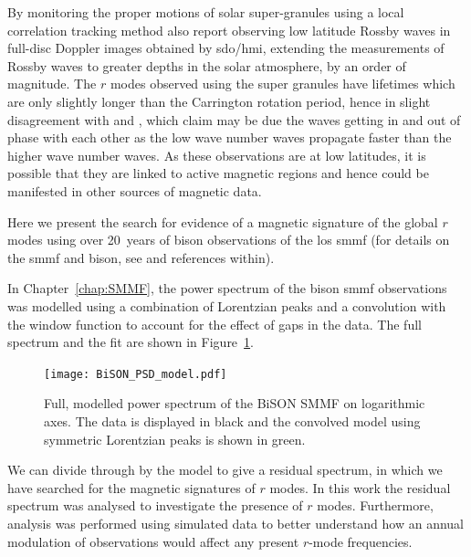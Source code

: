By monitoring the proper motions of solar super-granules using a local correlation tracking method \citet{hathaway_hydrodynamic_2020} also report observing low latitude Rossby waves in full-disc Doppler images obtained by \gls{sdo/hmi}, extending the measurements of Rossby waves to greater depths in the solar atmosphere, by an order of magnitude. The $r$ modes observed using the super granules have lifetimes which are only slightly longer than the Carrington rotation period, hence in slight disagreement with \citet{loptien_global-scale_2018} and \citet{liang_time-distance_2019}, which \citet{hathaway_hydrodynamic_2020} claim may be due the waves getting in and out of phase with each other as the low wave number waves propagate faster than the higher wave number waves. As these observations are at low latitudes, it is possible that they are linked to active magnetic regions and hence could be manifested in other sources of magnetic data.

Here we present the search for evidence of a magnetic signature of the global $r$ modes using over 20~years of \gls{bison} observations of the \gls{los} \gls{smmf} (for details on the \gls{smmf} and \gls{bison}, see \citet{chaplin_studies_2003} and references within).

In Chapter~\ref{chap:SMMF}, the power spectrum of the \gls{bison}  \gls{smmf} observations was modelled using a combination of Lorentzian peaks and a convolution with the window function to account for the effect of gaps in the data. The full spectrum and the fit are shown in Figure~\ref{fig:BiSON_PSD}.



\begin{figure}[ht!]
	\centering
	\texttt{[image: BiSON\_PSD\_model.pdf]}
	\caption{Full, modelled power spectrum of the BiSON SMMF on logarithmic axes. The data is displayed in black and the convolved model using symmetric Lorentzian peaks is shown in green.}
	\label{fig:BiSON_PSD}
\end{figure}

We can divide through by the model to give a residual spectrum, in which we have searched for the magnetic signatures of $r$ modes. In this work the residual spectrum was analysed to investigate the presence of $r$ modes. Furthermore, analysis was performed using simulated data to better understand how an annual modulation of observations would affect any present $r$-mode frequencies. 

